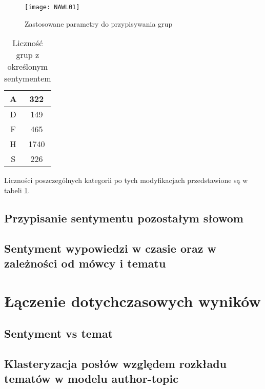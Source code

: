\documentclass[a4paper,11pt,twoside]{report}
\theoremstyle{definition}
\begin{document}
\begin{figure}[h]
\texttt{[image: NAWL01]} 
\centering \caption{Zastosowane parametry do przypisywania grup}
\label{pic:nawl01}
\end{figure}


\begin{table}[h] \centering
\begin{tabular}{|c|c|}
\hline
A & 322\\ \hline
D & 149\\ \hline
F & 465\\ \hline
H & 1740\\ \hline
S & 226\\ \hline
\end{tabular} \caption{Liczność grup z określonym sentymentem} \label{tab:nawl01}
\end{table}
Liczności poszczególnych kategorii po tych modyfikacjach przedstawione są w tabeli \ref{tab:nawl01}.










\section{Przypisanie sentymentu pozostałym słowom}

\section{Sentyment wypowiedzi w czasie oraz w zależności od mówcy i tematu}


\chapter{Łączenie dotychczasowych wyników}\label{models}

\section{Sentyment vs temat }

\section{Klasteryzacja posłów względem rozkładu tematów w modelu author-topic}


\end{document}
